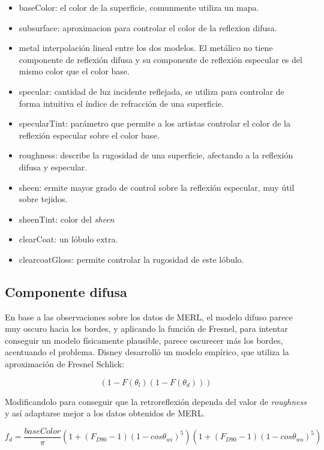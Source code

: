 \begin{itemize}
	\item baseColor: el color de la superficie, comunmente utiliza un mapa.
	\item subsurface: aproximacion para controlar el color de la reflexion difusa.
	\item metal interpolaci\'on lineal entre los dos modelos. El met\'alico no tiene
    componente de reflexi\'on difusa y su componente de reflexi\'on especular es del mismo color que el color base. 
    \item specular: cantidad de luz incidente reflejada, se utiliza para controlar de forma intuitiva el \'indice de refracci\'on de
    una superficie.
	\item specularTint: par\'ametro que permite a los artistas controlar el color de la reflexi\'on especular sobre el color
	base.
	\item roughness: describe la rugosidad de una superficie, afectando a la reflexi\'on difusa y especular.
	\item sheen: ermite mayor grado de control sobre la reflexi\'on especular, muy \'util sobre tejidos.
	\item sheenTint: color del \textit{sheen}
	\item clearCoat: un l\'obulo extra.
	\item clearcoatGloss: permite controlar la rugosidad de este l\'obulo.
\end{itemize}
    
    \subsection{Componente difusa}

    En base a las observaciones sobre los datos de MERL, el modelo difuso parece muy oscuro hacia los bordes, y aplicando
    la funci\'on de Fresnel, para intentar conseguir un modelo f\'isicamente plausible, parece oscurecer m\'as los bordes,
    acentuando el problema. Disney desarroll\'o un modelo emp\'irico, que utiliza la aproximaci\'on de Fresnel Schlick:

    $$
    (1 - F(\theta_l) (1 - F(\theta_d)))
    $$

    Modificandolo para conseguir que la retroreflexi\'on dependa del valor de \textit{roughness} y as\'i
    adaptarse mejor a los datos obtenidos de MERL.

    $$
    f_d = \frac{baseColor}{\pi}
    \left(  1 + (F_{D90} - 1)(1 - cos\theta_{wi})^5  \right)
    \left(  1 + (F_{D90} - 1)(1 - cos\theta_{wo})^5  \right)
    $$
    
